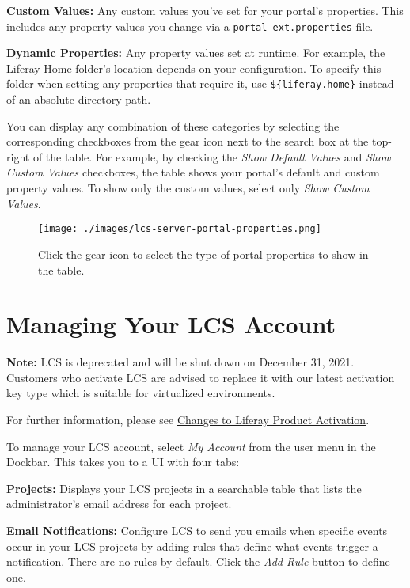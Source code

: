 \textbf{Custom Values:} Any custom values you've set for your portal's
properties. This includes any property values you change via a
\texttt{portal-ext.properties} file.

\textbf{Dynamic Properties:} Any property values set at runtime. For
example, the
\href{/docs/7-2/deploy/-/knowledge_base/d/liferay-home}{Liferay Home}
folder's location depends on your configuration. To specify this folder
when setting any properties that require it, use
\texttt{\$\{liferay.home\}} instead of an absolute directory path.

You can display any combination of these categories by selecting the
corresponding checkboxes from the gear icon next to the search box at
the top-right of the table. For example, by checking the \emph{Show
Default Values} and \emph{Show Custom Values} checkboxes, the table
shows your portal's default and custom property values. To show only the
custom values, select only \emph{Show Custom Values}.

\begin{figure}
\centering
\texttt{[image: ./images/lcs-server-portal-properties.png]}
\caption{Click the gear icon to select the type of portal properties to
show in the table.}
\end{figure}

\chapter{Managing Your LCS Account}\label{managing-your-lcs-account}

\noindent\hrulefill

\textbf{Note:} LCS is deprecated and will be shut down on December 31,
2021. Customers who activate LCS are advised to replace it with our
latest activation key type which is suitable for virtualized
environments.

For further information, please see
\href{https://help.liferay.com/hc/en-us/articles/4402347960845-Changes-to-Liferay-Product-Activation}{Changes
to Liferay Product Activation}.

\noindent\hrulefill

To manage your LCS account, select \emph{My Account} from the user menu
in the Dockbar. This takes you to a UI with four tabs:

\textbf{Projects:} Displays your LCS projects in a searchable table that
lists the administrator's email address for each project.

\textbf{Email Notifications:} Configure LCS to send you emails when
specific events occur in your LCS projects by adding rules that define
what events trigger a notification. There are no rules by default. Click
the \emph{Add Rule} button to define one.

